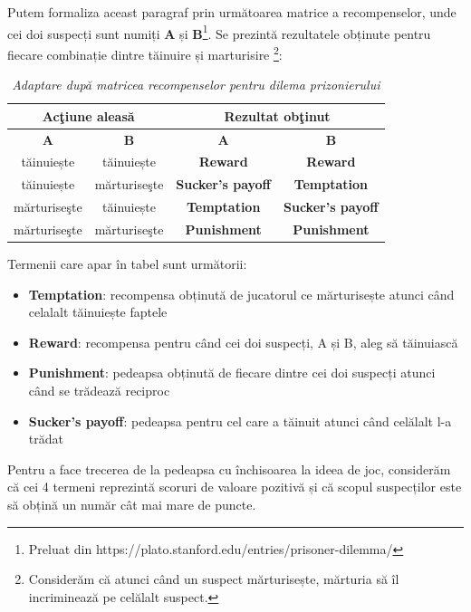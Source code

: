 Putem formaliza aceast paragraf prin următoarea matrice a recompenselor, unde cei doi suspecți sunt numiți \textbf{A} și \textbf{B}\footnote{Preluat din https://plato.stanford.edu/entries/prisoner-dilemma/}. Se prezintă rezultatele obținute pentru fiecare combinație dintre tăinuire și marturisire \footnote{Considerăm că atunci când un suspect mărturisește, mărturia să îl incriminează pe celălalt suspect.}:  

\begin{table}[H]
	\centering
	\def\arraystretch{1.75}
	\begin{tabular}{|c|c|c|c|}
		\hline
		\multicolumn{2}{|c|}{\textbf{Acţiune aleasă}} & \multicolumn{2}{c|}{\textbf{Rezultat obţinut}} \\ \hline
		\textbf{A} & \textbf{B} & \textbf{A} & \textbf{B} \\ \hline
		tăinuiește & tăinuiește & \textbf{Reward} & \textbf{Reward} \\ \hline
		tăinuiește & mărturiseşte & \textbf{Sucker's payoff} & \textbf{Temptation} \\ \hline
		mărturiseşte & tăinuiește & \textbf{Temptation} & \textbf{Sucker's payoff} \\ \hline
		mărturiseşte & mărturiseşte & \textbf{Punishment} & \textbf{Punishment} \\ \hline
	\end{tabular}
	\caption{\textit{Adaptare după matricea recompenselor pentru dilema prizonierului}}
	\label{matricea_recompenselor}
\end{table}

Termenii care apar în tabel sunt următorii: 
 
\begin{itemize} 
	\item \textbf{Temptation}: recompensa obținută de jucatorul ce mărturisește atunci când celalalt tăinuiește faptele 
	\item \textbf{Reward}: recompensa pentru când cei doi suspecți, A și B, aleg să tăinuiască 
	\item \textbf{Punishment}: pedeapsa obținută de fiecare dintre cei doi suspecți atunci când se trădează reciproc 
	\item \textbf{Sucker's payoff}: pedeapsa pentru cel care a tăinuit atunci când celălalt l-a trădat 
\end{itemize} 
 
Pentru a face trecerea de la pedeapsa cu închisoarea la ideea de joc, considerăm că cei 4 termeni reprezintă scoruri de valoare pozitivă și că scopul suspecților este să obțină un număr cât mai mare de puncte. 

